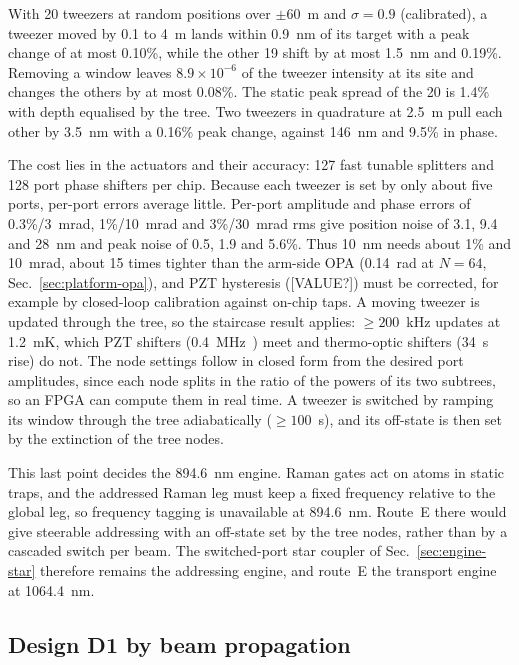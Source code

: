 With 20 tweezers at random positions over $\pm60$~\textmu m and $\sigma = 0.9$ (calibrated), a tweezer moved by 0.1 to 4~\textmu m lands within 0.9~nm of its target with a peak change of at most 0.10\%, while the other 19 shift by at most 1.5~nm and 0.19\%. Removing a window leaves $8.9\times10^{-6}$ of the tweezer intensity at its site and changes the others by at most 0.08\%. The static peak spread of the 20 is 1.4\% with depth equalised by the tree. Two tweezers in quadrature at 2.5~\textmu m pull each other by 3.5~nm with a 0.16\% peak change, against 146~nm and 9.5\% in phase.

The cost lies in the actuators and their accuracy: 127 fast tunable splitters and 128 port phase shifters per chip. Because each tweezer is set by only about five ports, per-port errors average little. Per-port amplitude and phase errors of 0.3\%/3~mrad, 1\%/10~mrad and 3\%/30~mrad rms give position noise of 3.1, 9.4 and 28~nm and peak noise of 0.5, 1.9 and 5.6\%. Thus 10~nm needs about 1\% and 10~mrad, about 15 times tighter than the arm-side OPA (0.14~rad at $N = 64$, Sec.~\ref{sec:platform-opa}), and PZT hysteresis ([VALUE?]) must be corrected, for example by closed-loop calibration against on-chip taps. A moving tweezer is updated through the tree, so the staircase result applies: $\ge 200$~kHz updates at 1.2~mK, which PZT shifters (0.4~MHz~\cite{MONT}) meet and thermo-optic shifters (34~\textmu s rise) do not. The node settings follow in closed form from the desired port amplitudes, since each node splits in the ratio of the powers of its two subtrees, so an FPGA can compute them in real time. A tweezer is switched by ramping its window through the tree adiabatically ($\ge 100$~\textmu s), and its off-state is then set by the extinction of the tree nodes.

This last point decides the 894.6~nm engine. Raman gates act on atoms in static traps, and the addressed Raman leg must keep a fixed frequency relative to the global leg, so frequency tagging is unavailable at 894.6~nm. Route~E there would give steerable addressing with an off-state set by the tree nodes, rather than by a cascaded switch per beam. The switched-port star coupler of Sec.~\ref{sec:engine-star} therefore remains the addressing engine, and route~E the transport engine at 1064.4~nm.

\subsection{Design D1 by beam propagation}\label{sec:engine-D1}

